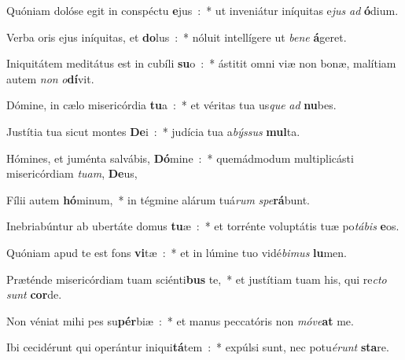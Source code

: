 ﻿\item Quóniam dolóse egit in conspéctu \textbf{e}jus~:~* ut inveniátur iníquitas e\emph{jus} \emph{ad} \textbf{ó}dium.
\item Verba oris ejus iníquitas, et \textbf{do}lus~:~* nóluit intellígere ut \emph{be}\emph{ne} \textbf{á}geret.
\item Iniquitátem meditátus est in cubíli \textbf{su}o~:~* ástitit omni viæ non bonæ, malítiam autem \emph{non} \emph{o}\textbf{dí}vit.
\item Dómine, in cælo misericórdia \textbf{tu}a~:~* et véritas tua us\emph{que} \emph{ad} \textbf{nu}bes.
\item Justítia tua sicut montes \textbf{De}i~:~* judícia tua a\emph{býs}\emph{sus} \textbf{mul}ta.
\item Hómines, et juménta salvábis, \textbf{Dó}mine~:~* quemádmodum multiplicásti misericórdiam \emph{tu}\emph{am}, \textbf{De}us,
\item Fílii autem \textbf{hó}minum,~* in tégmine alárum tuá\emph{rum} \emph{spe}\textbf{rá}bunt.
\item Inebriabúntur ab ubertáte domus \textbf{tu}æ~:~* et torrénte voluptátis tuæ po\emph{tá}\emph{bis} \textbf{e}os.
\item Quóniam apud te est fons \textbf{vi}tæ~:~* et in lúmine tuo vidé\emph{bi}\emph{mus} \textbf{lu}men.
\item Præténde misericórdiam tuam sciénti\textbf{bus} te,~* et justítiam tuam his, qui re\emph{cto} \emph{sunt} \textbf{cor}de.
\item Non véniat mihi pes su\textbf{pér}biæ~:~* et manus peccatóris non \emph{mó}\emph{ve}\textbf{at} me.
\item Ibi cecidérunt qui operántur iniqui\textbf{tá}tem~:~* expúlsi sunt, nec potu\emph{é}\emph{runt} \textbf{sta}re.